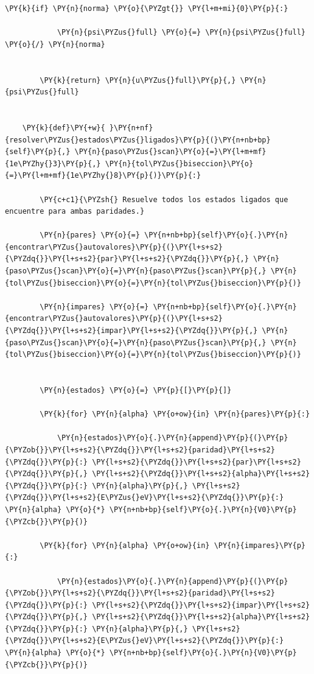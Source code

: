 \documentclass[11pt]{article}
\makeatletter
\def\PY@reset{\let\PY@it=\relax \let\PY@bf=\relax \let\PY@ul=\relax \let\PY@tc=\relax \let\PY@bc=\relax \let\PY@ff=\relax}
\def\PY@tok#1{\csname PY@tok@#1\endcsname}
\def\PY@toks#1+{\ifx\relax#1\empty\else \PY@tok{#1}\expandafter\PY@toks\fi}
\def\PY@do#1{\PY@bc{\PY@tc{\PY@ul{\PY@it{\PY@bf{\PY@ff{#1}}}}}}}
\def\PY#1#2{\PY@reset\PY@toks#1+\relax+\PY@do{#2}}
\makeatother
\begin{document}
\begin{tcolorbox}[breakable, size=fbox, boxrule=1pt, pad at break*=1mm,colback=cellbackground, colframe=cellborder]
\begin{Verbatim}[commandchars=\\\{\}]
        \PY{k}{if} \PY{n}{norma} \PY{o}{\PYZgt{}} \PY{l+m+mi}{0}\PY{p}{:}

            \PY{n}{psi\PYZus{}full} \PY{o}{=} \PY{n}{psi\PYZus{}full} \PY{o}{/} \PY{n}{norma}


        \PY{k}{return} \PY{n}{u\PYZus{}full}\PY{p}{,} \PY{n}{psi\PYZus{}full}


    \PY{k}{def}\PY{+w}{ }\PY{n+nf}{resolver\PYZus{}estados\PYZus{}ligados}\PY{p}{(}\PY{n+nb+bp}{self}\PY{p}{,} \PY{n}{paso\PYZus{}scan}\PY{o}{=}\PY{l+m+mf}{1e\PYZhy{}3}\PY{p}{,} \PY{n}{tol\PYZus{}biseccion}\PY{o}{=}\PY{l+m+mf}{1e\PYZhy{}8}\PY{p}{)}\PY{p}{:}

        \PY{c+c1}{\PYZsh{} Resuelve todos los estados ligados que encuentre para ambas paridades.}

        \PY{n}{pares} \PY{o}{=} \PY{n+nb+bp}{self}\PY{o}{.}\PY{n}{encontrar\PYZus{}autovalores}\PY{p}{(}\PY{l+s+s2}{\PYZdq{}}\PY{l+s+s2}{par}\PY{l+s+s2}{\PYZdq{}}\PY{p}{,} \PY{n}{paso\PYZus{}scan}\PY{o}{=}\PY{n}{paso\PYZus{}scan}\PY{p}{,} \PY{n}{tol\PYZus{}biseccion}\PY{o}{=}\PY{n}{tol\PYZus{}biseccion}\PY{p}{)}

        \PY{n}{impares} \PY{o}{=} \PY{n+nb+bp}{self}\PY{o}{.}\PY{n}{encontrar\PYZus{}autovalores}\PY{p}{(}\PY{l+s+s2}{\PYZdq{}}\PY{l+s+s2}{impar}\PY{l+s+s2}{\PYZdq{}}\PY{p}{,} \PY{n}{paso\PYZus{}scan}\PY{o}{=}\PY{n}{paso\PYZus{}scan}\PY{p}{,} \PY{n}{tol\PYZus{}biseccion}\PY{o}{=}\PY{n}{tol\PYZus{}biseccion}\PY{p}{)}


        \PY{n}{estados} \PY{o}{=} \PY{p}{[}\PY{p}{]}

        \PY{k}{for} \PY{n}{alpha} \PY{o+ow}{in} \PY{n}{pares}\PY{p}{:}

            \PY{n}{estados}\PY{o}{.}\PY{n}{append}\PY{p}{(}\PY{p}{\PYZob{}}\PY{l+s+s2}{\PYZdq{}}\PY{l+s+s2}{paridad}\PY{l+s+s2}{\PYZdq{}}\PY{p}{:} \PY{l+s+s2}{\PYZdq{}}\PY{l+s+s2}{par}\PY{l+s+s2}{\PYZdq{}}\PY{p}{,} \PY{l+s+s2}{\PYZdq{}}\PY{l+s+s2}{alpha}\PY{l+s+s2}{\PYZdq{}}\PY{p}{:} \PY{n}{alpha}\PY{p}{,} \PY{l+s+s2}{\PYZdq{}}\PY{l+s+s2}{E\PYZus{}eV}\PY{l+s+s2}{\PYZdq{}}\PY{p}{:} \PY{n}{alpha} \PY{o}{*} \PY{n+nb+bp}{self}\PY{o}{.}\PY{n}{V0}\PY{p}{\PYZcb{}}\PY{p}{)}

        \PY{k}{for} \PY{n}{alpha} \PY{o+ow}{in} \PY{n}{impares}\PY{p}{:}

            \PY{n}{estados}\PY{o}{.}\PY{n}{append}\PY{p}{(}\PY{p}{\PYZob{}}\PY{l+s+s2}{\PYZdq{}}\PY{l+s+s2}{paridad}\PY{l+s+s2}{\PYZdq{}}\PY{p}{:} \PY{l+s+s2}{\PYZdq{}}\PY{l+s+s2}{impar}\PY{l+s+s2}{\PYZdq{}}\PY{p}{,} \PY{l+s+s2}{\PYZdq{}}\PY{l+s+s2}{alpha}\PY{l+s+s2}{\PYZdq{}}\PY{p}{:} \PY{n}{alpha}\PY{p}{,} \PY{l+s+s2}{\PYZdq{}}\PY{l+s+s2}{E\PYZus{}eV}\PY{l+s+s2}{\PYZdq{}}\PY{p}{:} \PY{n}{alpha} \PY{o}{*} \PY{n+nb+bp}{self}\PY{o}{.}\PY{n}{V0}\PY{p}{\PYZcb{}}\PY{p}{)}



\end{Verbatim}
\end{tcolorbox}
\end{document}
